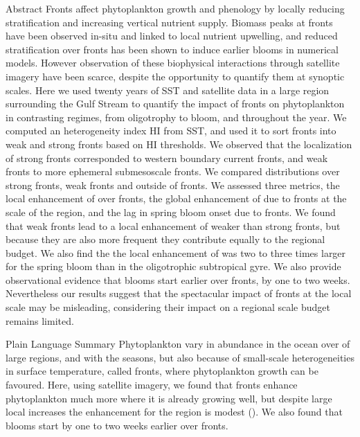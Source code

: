 \begin{articleBlock}{Abstract}
  Fronts affect phytoplankton growth and phenology by locally reducing stratification and increasing vertical nutrient supply.
  Biomass peaks at fronts have been observed in-situ and linked to local nutrient upwelling, and reduced stratification over fronts has been shown to induce earlier blooms in numerical models.
  However observation of these biophysical interactions through satellite imagery have been scarce, despite the opportunity to quantify them at synoptic scales.
  Here we used twenty years of SST and  satellite data in a large region surrounding the Gulf Stream to quantify the impact of fronts on phytoplankton in contrasting regimes, from oligotrophy to bloom, and throughout the year.
  We computed an heterogeneity index HI from SST, and used it to sort fronts into weak and strong fronts based on HI thresholds.
  We observed that the localization of strong fronts corresponded to western boundary current fronts, and weak fronts to more ephemeral submesoscale fronts.
  We compared  distributions over strong fronts, weak fronts and outside of fronts.
  We assessed three metrics, the local enhancement of  over fronts, the global enhancement of  due to fronts at the scale of the region, and the lag in spring bloom onset due to fronts.
  We found that weak fronts lead to a local enhancement of  weaker than strong fronts, but because they are also more frequent they contribute equally to the regional  budget.
  We also find the the local enhancement of  was two to three times larger for the spring bloom than in the oligotrophic subtropical gyre.
  We also provide observational evidence that blooms start earlier over fronts, by one to two weeks.
  Nevertheless our results suggest that the spectacular impact of fronts at the local scale may be misleading, considering their impact on a regional scale budget remains limited.
\end{articleBlock}


\begin{articleBlock}{Plain Language Summary}
  Phytoplankton vary in abundance in the ocean over of large regions, and with the seasons, but also because of small-scale heterogeneities in surface temperature, called fronts, where phytoplankton growth can be favoured.
  Here, using satellite imagery, we found that fronts enhance phytoplankton much more where it is already growing well, but despite large local increases the  enhancement for the region is modest (). We also found that blooms start by one to two weeks earlier over fronts.
\end{articleBlock}


